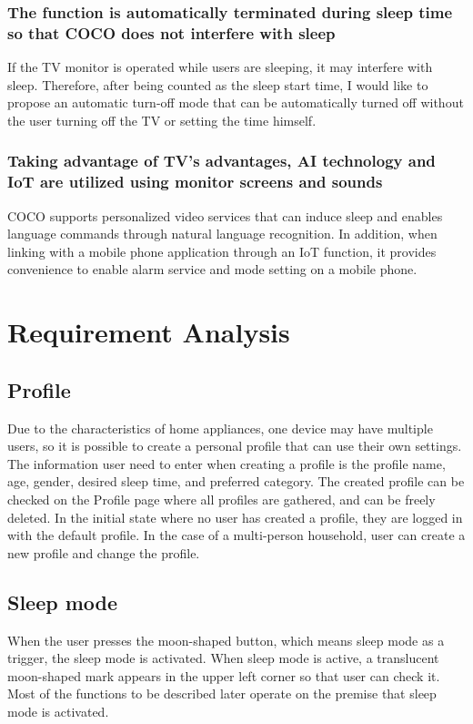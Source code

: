 \documentclass[conference]{IEEEtran}
\begin{document}
\subsubsection{The function is automatically terminated during sleep time so that COCO does not interfere with sleep}
If the TV monitor is operated while users are sleeping, it may interfere with sleep. Therefore, after being counted as the sleep start time, I would like to propose an automatic turn-off mode that can be automatically turned off without the user turning off the TV or setting the time himself.
\vspace{1\baselineskip}
\subsubsection{Taking advantage of TV's advantages, AI technology and IoT are utilized using monitor screens and sounds}
COCO supports personalized video services that can induce sleep and enables language commands through natural language recognition. In addition, when linking with a mobile phone application through an IoT function, it provides convenience to enable alarm service and mode setting on a mobile phone.

\vspace{2\baselineskip}
\section{Requirement Analysis}
\vspace{1\baselineskip}
\subsection{Profile}
Due to the characteristics of home appliances, one device may have multiple users, so it is possible to create a personal profile that can use their own settings. The information user need to enter when creating a profile is the profile name, age, gender, desired sleep time, and preferred category. The created profile can be checked on the Profile page where all profiles are gathered, and can be freely deleted. In the initial state where no user has created a profile, they are logged in with the default profile. In the case of a multi-person household, user can create a new profile and change the profile.
\vspace{1\baselineskip}
\subsection{Sleep mode}
When the user presses the moon-shaped button, which means sleep mode as a trigger, the sleep mode is activated. When sleep mode is active, a translucent moon-shaped mark appears in the upper left corner so that user can check it. Most of the functions to be described later operate on the premise that sleep mode is activated.
\vspace{1\baselineskip}
\end{document}
